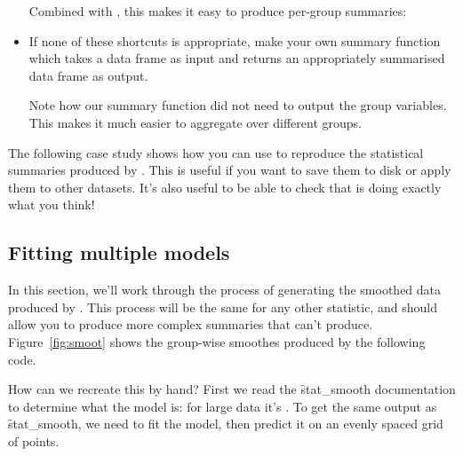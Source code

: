 \begin{itemize}
  Combined with , this makes it easy to produce per-group summaries:
  
    
  
  \item If none of these shortcuts is appropriate, make your own summary function which takes a data frame as input and returns an appropriately summarised data frame as output.
  
    
  
  Note how our summary function did not need to output the group variables.  This makes it much easier to aggregate over different groups.
\end{itemize}

The following case study shows how you can use  to reproduce the statistical summaries produced by \ggplot.  This is useful if you want to save them to disk or apply them to other datasets.  It's also useful to be able to check that \ggplot is doing exactly what you think!

\subsection{Fitting multiple models}
\label{sub:multiple_models}

In this section, we'll work through the process of generating the smoothed data produced by .  This process will be the same for any other statistic, and should allow you to produce more complex summaries that \ggplot can't produce.  Figure~\ref{fig:smoot} shows the group-wise smoothes produced by the following code.

% 


How can we recreate this by hand?  First we read the \f{stat_smooth} documentation to determine what the model is: for large data it's .  To get the same output as \f{stat_smooth}, we need to fit the model, then predict it on an evenly spaced grid of points.

